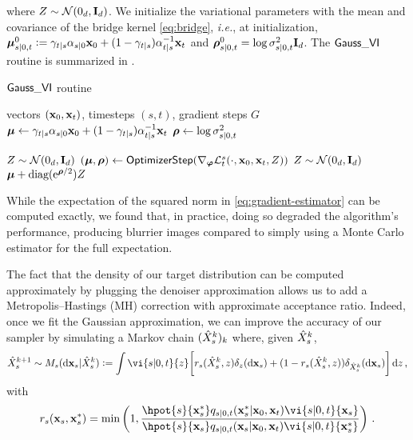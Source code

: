 where $Z \sim \mathcal{N}(0_{d}, \mathbf{I}_{d})$. We initialize the variational parameters with the mean and covariance of the bridge kernel \eqref{eq:bridge},  \emph{i.e.}, at initialization, ${\bm\mu}^0 _{s|0, t} \vcentcolon= \gamma_{t|s} \alpha_{s|0} \mathbf{x}_0 + (1 - \gamma_{t|s}) \alpha^{-1} _{t|s} \mathbf{x}_t$ and ${\bm\rho}^0 _{s|0, t} = \log \sigma^2 _{s|0, t} \mathbf{I}_{d}$.
The $\small{\mathsf{Gauss}\_\mathsf{VI}}$ routine is summarized in . 
\begin{algorithm}
    \caption{$\small{\mathsf{Gauss}\_\mathsf{VI}}$ routine}
    \begin{algorithmic}[1]
         vectors $(\mathbf{x}_0, \mathbf{x}_t)$, timesteps $(s, t)$, gradient steps $G$
        \STATE ${\bm\mu} \gets \gamma_{t|s} \alpha_{s|0} \mathbf{x}_0 + (1 - \gamma_{t|s}) \alpha^{-1} _{t|s} \mathbf{x}_t$
        \STATE ${\bm\rho} \gets \log \sigma^2 _{s|0, t}$

            \STATE $Z \sim \mathcal{N}(0_{d}, \mathbf{I}_{d})$
            \STATE $({\bm\mu}, {\bm\rho}) \gets \mathsf{OptimizerStep}(\nabla _{\bm\varphi} \mathcal{L}^s _t(\cdot, \mathbf{x}_0, \mathbf{x}_t, Z))$
        \ENDFOR
        \STATE $Z \sim \mathcal{N}(0_{d}, \mathbf{I}_{d})$
         ${\bm\mu} + \mbox{diag}(\mathrm{e}^{{\bm\rho} / 2}) Z$
    \end{algorithmic}
    \label{algo:gauss_vi}
\end{algorithm}
\begin{remark} 
    While the expectation of the squared norm in \eqref{eq:gradient-estimator} can be computed exactly, we found that, in practice, doing so degraded the algorithm’s performance, producing blurrier images compared to simply using a Monte Carlo estimator for the full expectation.
\end{remark} 
\begin{remark} 
    \label{rem:metropolis}
    The fact that the density of our target distribution can be computed approximately by plugging the denoiser approximation allows us to add a Metropolis--Hastings (MH) correction with approximate acceptance ratio. Indeed, once we fit the Gaussian approximation, we can improve the accuracy of our sampler by simulating a Markov chain $(\hat{X}^k _s)_k$ where, given $\hat{X}^k _s$, 
    $$ 
    \vX^{k+1} _s \sim M_s(\rmd \bx_s | \vX^k _s) \eqdef \int \vi{s|0,t}{z} \bigg[ r_s(\vX^k _s, z) \delta_{z}(\rmd \bx_s) + (1 - r_s(\vX^k _s, z) ) \delta_{\vX^k _s}(\rmd \bx_s)\bigg]\, \rmd z \eqsp,
    $$ 
    with
    $$ 
        r_s(\bx_s, \bx^* _s) = \mbox{min}\left(1, \frac{\hpot{s}{\bx^* _s} \fw{s|0, t}{\bx_0, \bx_t}{\bx^* _s} \vi{s|0,t}{\bx_s}}{\hpot{s}{\bx _s} \fw{s|0, t}{\bx_0, \bx_t}{\bx _s} \vi{s|0,t}{\bx^* _s}} \right) \eqsp.
    $$ 
\end{remark}
